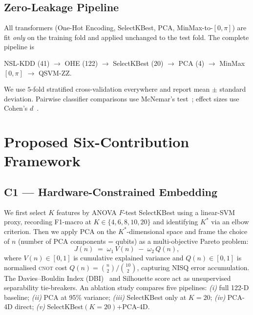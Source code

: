 \documentclass[journal]{IEEEtran}
\newcommand{\ZZ}{\textsc{ZZ}}
\newcommand{\QSVM}{QSVM-\ZZ}
\begin{document}
  \subsection{Zero-Leakage Pipeline}
  All transformers (One-Hot Encoding, SelectKBest, PCA,
  MinMax-to-$[0,\pi]$) are fit \emph{only} on the training fold and
  applied unchanged to the test fold. The complete pipeline is
  \begin{center}
  \small
  NSL-KDD (41) $\rightarrow$ OHE (122)
  $\rightarrow$ SelectKBest (20) $\rightarrow$ PCA (4)
  $\rightarrow$ MinMax$[0,\pi]$ $\rightarrow$ \QSVM{}.
  \end{center}
  We use $5$-fold stratified cross-validation everywhere and report
  mean $\pm$ standard deviation. Pairwise classifier comparisons use
  McNemar's test~\cite{mcnemar1947note}; effect sizes use Cohen's
  $d$~\cite{cohen1988statistical}.

  \section{Proposed Six-Contribution Framework}\label{sec:method}

  \subsection{C1 --- Hardware-Constrained Embedding}\label{sec:method-c1}
  We first select $K$ features by ANOVA $F$-test SelectKBest using a
  linear-SVM proxy, recording F1-macro at $K\in\{4,6,8,10,20\}$ and
  identifying $K^{*}$ via an elbow criterion. Then we apply PCA on the
  $K^{*}$-dimensional space and frame the choice of $n$ (number of
  PCA components = qubits) as a multi-objective Pareto problem:
  \begin{equation}
  J(n)\;=\;\omega_1\,V(n)\;-\;\omega_2\,Q(n),
  \label{eq:pareto}
  \end{equation}
  where $V(n)\in[0,1]$ is cumulative explained variance and $Q(n)\in
  [0,1]$ is normalised \textsc{cnot} cost
  $Q(n)=\binom{n}{2}/\binom{10}{2}$, capturing NISQ error
  accumulation. The Davies--Bouldin Index
  (DBI)~\cite{davies1979cluster} and Silhouette score act as
  unsupervised separability tie-breakers. An ablation study compares
  five pipelines: \emph{(i)} full 122-D baseline; \emph{(ii)} PCA at
  95\% variance; \emph{(iii)} SelectKBest only at $K{=}20$; \emph{(iv)}
  PCA-4D direct; \emph{(v)} SelectKBest$(K{=}20)$+PCA-4D.
\end{document}
